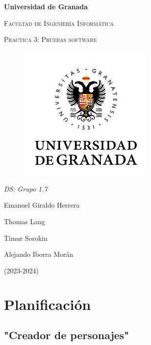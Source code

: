 \documentclass{article}
\begin{document}
    \begin{titlepage}
        \centering
        {\bfseries\LARGE Universidad de Granada\par}
        \vspace{1cm}
        {\scshape\Large Facultad de Ingeniería Informática \par}
        \vspace{2cm}
        {\scshape\Huge Practica 3: Pruebas software \par}
        \begin{figure}[h]
                \centering
                \includegraphics[width=0.6\textwidth]{logo_UGR.jpg}
                \label{fig:portada}
            \end{figure}
        {\itshape\Large DS: Grupo 1.7\par}
        \vfill
            {\Large  Emanuel Giraldo Herrera\par}
            {\Large  Thomas Lang \par}
            {\Large  Timur Sorokin \par}
            {\Large  Alejando Iborra Morán \par}
        \vfill
        {\Large (2023-2024) \par}
    \end{titlepage}

\tableofcontents

\newpage
\section{Planificación}

\subsection{"Creador de personajes"}
\end{document}
